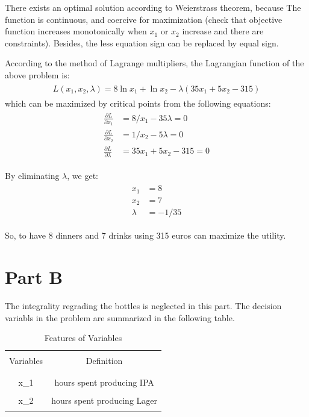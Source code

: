 \documentclass[fleqn,10pt]{wlscirep}
\begin{document}
There exists an optimal solution according to Weierstrass theorem, because The function is continuous, and coercive for maximization (check that objective function increases monotonically when $x_{1}$ or $x_{2}$ increase and there are constraints). Besides, the less equation sign can be replaced by equal sign.

According to the method of Lagrange multipliers, the Lagrangian function of the above problem is:
\begin{align} \begin{split}
    L(x_{1}, x_{2}, \lambda) = 8 \ln{x_{1}} + \ln{x_{2}} - \lambda (35 x_{1} + 5 x_{2} - 315)
\end{split} \end{align} 
which can be maximized by critical points from the following equations:
\begin{align} \begin{split}
    \frac{\partial L}{\partial x_{1}} &= 8 / x_{1} - 35 \lambda = 0 \\
    \frac{\partial L}{\partial x_{2}} &= 1 / x_{2} - 5 \lambda = 0 \\
    \frac{\partial L}{\partial \lambda} &= 35 x_{1} + 5 x_{2} - 315 = 0
\end{split} \end{align} 

By eliminating $\lambda$, we get:
\begin{align} \begin{split}
    x_{1} &= 8 \\
    x_{2} &= 7 \\
    \lambda &= - 1 / 35
\end{split} \end{align} 

So, to have 8 dinners and 7 drinks using 315 euros can maximize the utility.

\section{Part B}

The integrality regrading the bottles is neglected in this part. The decision variabls in the problem are summarized in the following table.

\begin{table}[ht]
    \centering
    \begin{tabular}{C C}
        \hline
        \\[-1em]
        Variables & Definition \\
        \\[-1em]
        \hline
        \\[-1em]
        x_{1} & hours spent producing IPA \\
        \\[-1em]
        x_{2} & hours spent producing Lager \\
        \\[-1em]
        \hline
    \end{tabular}
    \caption{Features of Variables}
    \label{tab:1}
\end{table}
\FloatBarrier
\end{document}
